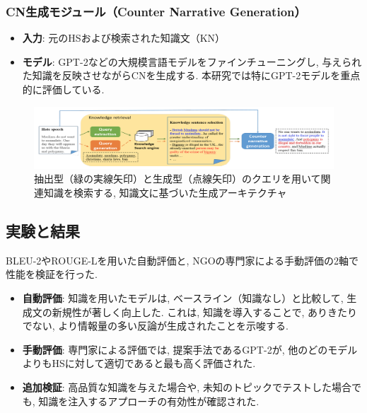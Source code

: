 \documentclass[dvipdfmx]{jsarticle}
\begin{document}
\subsubsection{CN生成モジュール（Counter Narrative Generation）}

\begin{itemize}
  \item \textbf{入力}: 元のHSおよび検索された知識文（KN）
  \item \textbf{モデル}: GPT-2などの大規模言語モデルをファインチューニングし, 与えられた知識を反映させながらCNを生成する.
        本研究では特にGPT-2モデルを重点的に評価している.
\end{itemize}

\begin{figure}[H]
  \centering
  \includegraphics[width=1.0\textwidth]{02.png}
  \caption{抽出型（緑の実線矢印）と生成型（点線矢印）のクエリを用いて関連知識を検索する, 知識文に基づいた生成アーキテクチャ\cite{chung2021}}
  \label{fig:architecture}
\end{figure}

\vspace{0.5em}

\subsection{実験と結果}

BLEU-2やROUGE-Lを用いた自動評価と, NGOの専門家による手動評価の2軸で性能を検証を行った.

\begin{itemize}
  \item \textbf{自動評価}: 知識を用いたモデルは, ベースライン（知識なし）と比較して, 生成文の新規性が著しく向上した.
        これは, 知識を導入することで, ありきたりでない, より情報量の多い反論が生成されたことを示唆する.

  \item \textbf{手動評価}: 専門家による評価では, 提案手法であるGPT-2が, 他のどのモデルよりもHSに対して適切であると最も高く評価された.

  \item \textbf{追加検証}: 高品質な知識を与えた場合や, 未知のトピックでテストした場合でも, 知識を注入するアプローチの有効性が確認された.
\end{itemize}
\end{document}
